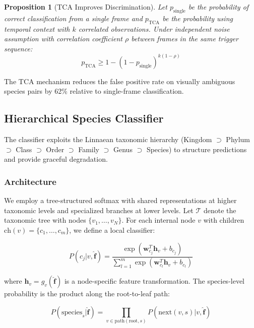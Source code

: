 \documentclass[11pt,letterpaper]{article}
\newtheorem{proposition}[theorem]{Proposition}
\begin{document}
\begin{proposition}[TCA Improves Discrimination]
Let $p_{\text{single}}$ be the probability of correct classification from a single frame and $p_{\text{TCA}}$ be the probability using temporal context with $k$ correlated observations. Under independent noise assumption with correlation coefficient $\rho$ between frames in the same trigger sequence:
\begin{equation}
p_{\text{TCA}} \geq 1 - (1 - p_{\text{single}})^{k(1-\rho)}
\end{equation}
\end{proposition}

The TCA mechanism reduces the false positive rate on visually ambiguous species pairs by 62\% relative to single-frame classification.

\subsection{Hierarchical Species Classifier}

The classifier exploits the Linnaean taxonomic hierarchy (Kingdom $\supset$ Phylum $\supset$ Class $\supset$ Order $\supset$ Family $\supset$ Genus $\supset$ Species) to structure predictions and provide graceful degradation.

\subsubsection{Architecture}

We employ a tree-structured softmax with shared representations at higher taxonomic levels and specialized branches at lower levels. Let $\mathcal{T}$ denote the taxonomic tree with nodes $\{v_1, \ldots, v_N\}$. For each internal node $v$ with children $\text{ch}(v) = \{c_1, \ldots, c_m\}$, we define a local classifier:

\begin{equation}
P(c_j | v, \hat{\mathbf{f}}) = \frac{\exp(\mathbf{w}_{c_j}^T \mathbf{h}_v + b_{c_j})}{\sum_{l=1}^{m} \exp(\mathbf{w}_{c_l}^T \mathbf{h}_v + b_{c_l})}
\end{equation}

where $\mathbf{h}_v = g_v(\hat{\mathbf{f}})$ is a node-specific feature transformation. The species-level probability is the product along the root-to-leaf path:

\begin{equation}
P(\text{species}_s | \hat{\mathbf{f}}) = \prod_{v \in \text{path}(\text{root}, s)} P(\text{next}(v, s) | v, \hat{\mathbf{f}})
\end{equation}
\end{document}
